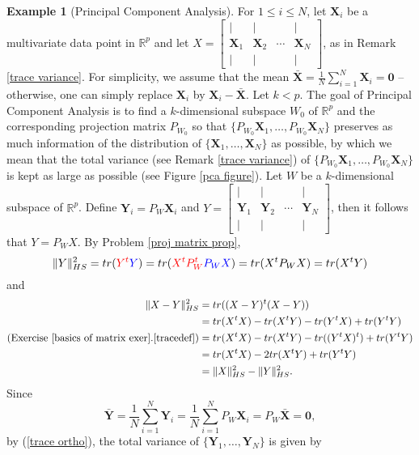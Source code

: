 \documentclass[12pt,letterpaper]{book}
\def\red{\textcolor{red}}
\def\blue{\textcolor{blue}}
\numberwithin{equation}{section}
\theoremstyle{definition}
\newtheorem{example}[thm]{\textbf{Example}}
\begin{document}
\begin{example}[Principal Component Analysis]\label{example pca}
For $1\leq i \leq N$, let $\bm{X}_i$ be a multivariate data point in $\mathbb{R}^p$ and let $X=\left[\begin{array}{cccc} | & | &   & | \\ \bm{X}_1 & \bm{X}_2 & \cdots & \bm{X}_N \\ | & | &  & | \end{array}\right]$, as in Remark \ref{trace variance}. For simplicity, we assume that the mean $\displaystyle{\bar{\bm{X}}=\frac{1}{N}\sum_{i=1}^N \bm{X}_i=\bm{0}}$ -- otherwise, one can simply replace $\bm{X}_i$ by $\bm{X}_i-\bar{\bm{X}}$. Let $k<p$. The goal of Principal Component Analysis is to find a $k$-dimensional subspace $W_0$ of $\mathbb{R}^p$ and the corresponding projection matrix $P_{W_0}$ so that $\{P_{W_0}\bm{X}_1,\ldots,P_{W_0}\bm{X}_N\}$ preserves as much information of the distribution of $\{\bm{X}_1,\ldots,\bm{X}_N\}$ as possible, by which we mean that the total variance (see Remark \ref{trace variance}) of $\{P_{W_0}\bm{X}_1,\ldots,P_{W_0}\bm{X}_N\}$ is kept as large as possible (see Figure \ref{pca figure}). Let $W$ be a $k$-dimensional subspace of $\mathbb{R}^p$. Define $\bm{Y}_i=P_W\bm{X}_i$ and $Y=\left[\begin{array}{cccc} | & | &   & | \\ \bm{Y}_1 & \bm{Y}_2 & \cdots & \bm{Y}_N \\ | & | &  & | \end{array}\right]$, then it follows that $Y=P_WX$. By Problem \ref{proj matrix prop},
$$\|Y\|_{HS}^2=tr(\red{Y^t}\blue{Y})=tr(\red{X^tP_W^t}\blue{P_WX})=tr(X^tP_WX)=tr(X^tY)$$
and
\begin{equation}\label{trace ortho}
\begin{aligned}
\|X-Y\|_{HS}^2&=tr((X-Y)^t(X-Y))\\
&=tr(X^tX)-tr(X^tY)-tr(Y^tX)+tr(Y^tY)\\
(\text{Exercise }\ref{basics of matrix exer}.\ref{tracedef})&=tr(X^tX)-tr(X^tY)-tr((Y^tX)^t)+tr(Y^tY)\\
&=tr(X^tX)-2tr(X^tY)+tr(Y^tY)\\
&=\|X\|_{HS}^2-\|Y\|_{HS}^2.
\end{aligned}
\end{equation}
Since $$\bar{\bm{Y}}=\frac{1}{N}\sum_{i=1}^N \bm{Y}_i=\frac{1}{N}\sum_{i=1}^N P_W\bm{X}_i=P_W\bar{\bm{X}}=\bm{0},$$ by (\ref{trace ortho}), the total variance of $\{\bm{Y}_1,\ldots,\bm{Y}_N\}$ is given by

\end{example}
\end{document}
